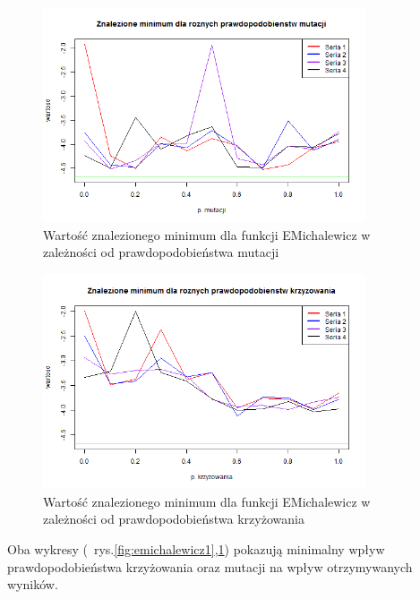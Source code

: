 \documentclass[11pt, a4paper]{article}
\newcommand{\fbi}{\leavevmode{\parindent=1em\indent}}
\begin{document}
\begin{figure}[H]
	\begin{center}
		\includegraphics[width=0.85\textwidth]{./assets/EMichalewicz2.png}
		\caption{Wartość znalezionego minimum dla funkcji EMichalewicz w zależności od prawdopodobieństwa mutacji}
		\label{fig:emichalewicz2}
	\end{center}
\end{figure}

\begin{figure}[H]
	\begin{center}
		\includegraphics[width=0.85\textwidth]{./assets/EMichalewicz3.png}
		\caption{Wartość znalezionego minimum dla funkcji EMichalewicz w zależności od prawdopodobieństwa krzyżowania}
		\label{fig:emichalewicz3}
	\end{center}
\end{figure}

\fbi
Oba wykresy (~rys.\ref{fig:emichalewicz1},\ref{fig:emichalewicz2}) pokazują minimalny wpływ prawdopodobieństwa krzyżowania oraz mutacji na wpływ otrzymywanych wyników. 
\end{document}
